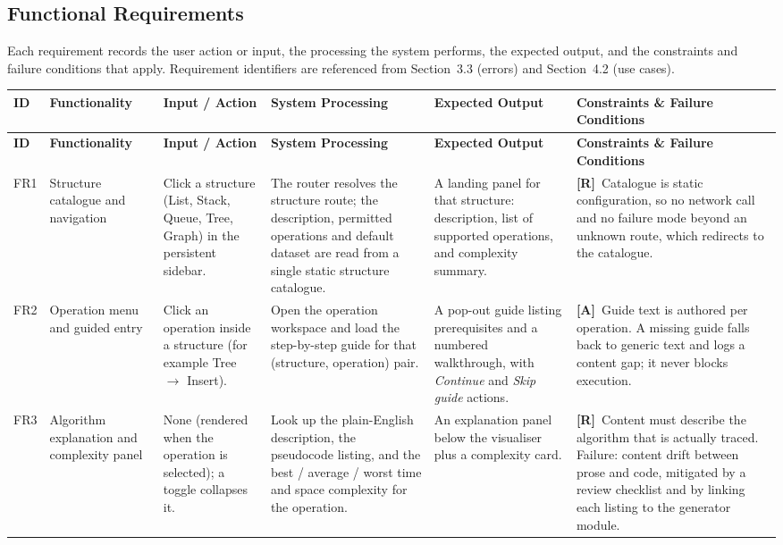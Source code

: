 \documentclass[11pt,a4paper]{article}
\newcommand{\R}{\textcolor{reqc}{\textbf{[R]}}}     %
\newcommand{\A}{\textcolor{asmc}{\textbf{[A]}}}     %
\begin{document}
\subsection{Functional Requirements}

Each requirement records the user action or input, the processing the system performs, the
expected output, and the constraints and failure conditions that apply. Requirement
identifiers are referenced from Section~3.3 (errors) and Section~4.2 (use cases).

{\footnotesize
\setlength{\tabcolsep}{3pt}
\begin{longtable}{@{}L{0.9cm}L{2.4cm}L{3.0cm}L{3.6cm}L{2.6cm}L{2.4cm}@{}}
\toprule
\textbf{ID} & \textbf{Functionality} & \textbf{Input / Action} & \textbf{System Processing} &
\textbf{Expected Output} & \textbf{Constraints \& Failure Conditions} \\
\midrule
\endfirsthead
\toprule
\textbf{ID} & \textbf{Functionality} & \textbf{Input / Action} & \textbf{System Processing} &
\textbf{Expected Output} & \textbf{Constraints \& Failure Conditions} \\
\midrule
\endhead
\bottomrule
\endlastfoot

FR1 & Structure catalogue and navigation &
Click a structure (List, Stack, Queue, Tree, Graph) in the persistent sidebar. &
The router resolves the structure route; the description, permitted operations and default
dataset are read from a single static structure catalogue. &
A landing panel for that structure: description, list of supported operations, and
complexity summary. &
\R\ Catalogue is static configuration, so no network call and no failure mode beyond an
unknown route, which redirects to the catalogue. \\

FR2 & Operation menu and guided entry &
Click an operation inside a structure (for example Tree $\rightarrow$ Insert). &
Open the operation workspace and load the step-by-step guide for that
(structure, operation) pair. &
A pop-out guide listing prerequisites and a numbered walkthrough, with \emph{Continue} and
\emph{Skip guide} actions. &
\A\ Guide text is authored per operation. A missing guide falls back to generic text and
logs a content gap; it never blocks execution. \\

FR3 & Algorithm explanation and complexity panel &
None (rendered when the operation is selected); a toggle collapses it. &
Look up the plain-English description, the pseudocode listing, and the best / average /
worst time and space complexity for the operation. &
An explanation panel below the visualiser plus a complexity card. &
\R\ Content must describe the algorithm that is actually traced. Failure: content drift
between prose and code, mitigated by a review checklist and by linking each listing to the
generator module. \\


\end{longtable}}
\end{document}
